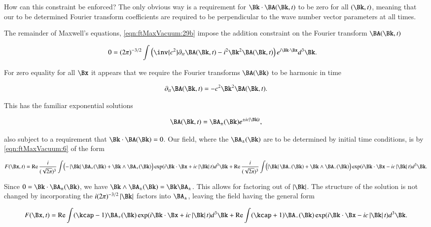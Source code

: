 How can this constraint be enforced?  The only obvious way is a requirement for $\Bk \cdot \BA(\Bk, t)$ to be zero for all $(\Bk,t)$, meaning that our to be determined Fourier transform coefficients are required to be perpendicular to the wave number vector parameters at all times.

The remainder of Maxwell's equations, \autoref{eqn:ftMaxVacuum:29b} impose the addition constraint on the Fourier transform $\BA(\Bk,t)$

\begin{align}\label{eqn:ftMaxVacuum:60}
0 &= (2 \pi)^{-3/2} \int \left( \inv{c^2} \partial_{tt} \BA(\Bk, t) - i^2 \Bk^2 \BA(\Bk, t)\right) e^{i \Bk \cdot \Bx } d^3 \Bk.
\end{align}

For zero equality for all $\Bx$ it appears that we require the Fourier transforms $\BA(\Bk)$ to be harmonic in time

\begin{align}\label{eqn:ftMaxVacuum:61}
\partial_{tt} \BA(\Bk, t) = - c^2 \Bk^2 \BA(\Bk, t).
\end{align}

This has the familiar exponential solutions

\begin{align}\label{eqn:ftMaxVacuum:62}
\BA(\Bk, t) = \BA_{\pm}(\Bk) e^{ \pm i c \Abs{\Bk} t },
\end{align}

also subject to a requirement that $\Bk \cdot \BA(\Bk) = 0$.  Our field, where the $\BA_{\pm}(\Bk)$ are to be determined by initial time conditions, is by \autoref{eqn:ftMaxVacuum:6} of the form

\begin{align}\label{eqn:ftMaxVacuum:63}
F(\Bx, t)
= 
\Real \frac{i}{(\sqrt{2\pi})^3} \int \Bigl( -\Abs{\Bk} \BA_{+}(\Bk) + \Bk \wedge \BA_{+}(\Bk) \Bigr) \exp(i \Bk \cdot \Bx + i c \Abs{\Bk} t) d^3 \Bk
+ \Real \frac{i}{(\sqrt{2\pi})^3} \int \Bigl( \Abs{\Bk} \BA_{-}(\Bk) + \Bk \wedge \BA_{-}(\Bk) \Bigr) \exp(i \Bk \cdot \Bx - i c \Abs{\Bk} t) d^3 \Bk.
\end{align}

Since $0 = \Bk \cdot \BA_{\pm}(\Bk)$, we have $\Bk \wedge \BA_{\pm}(\Bk) = \Bk \BA_{\pm}$.  This allows for factoring out of $\Abs{\Bk}$.  The structure of the solution is not changed by incorporating the $i (2\pi)^{-3/2} \Abs{\Bk}$ factors into $\BA_{\pm}$, leaving the field having the general form

\begin{align}\label{eqn:ftMaxVacuum:64}
F(\Bx, t)
= 
\Real \int ( \kcap - 1 ) \BA_{+}(\Bk) \exp(i \Bk \cdot \Bx + i c \Abs{\Bk} t) d^3 \Bk
+ \Real \int ( \kcap + 1 ) \BA_{-}(\Bk) \exp(i \Bk \cdot \Bx - i c \Abs{\Bk} t) d^3 \Bk.
\end{align}

